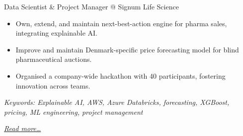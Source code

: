 \large{Data Scientist \& Project Manager @ Signum Life Science}

\normalsize
\begin{itemize}
\item Own, extend, and maintain next-best-action engine for pharma sales, integrating explainable AI.
\item Improve and maintain Denmark-specific price forecasting model for blind pharmaceutical auctions.
\item Organised a company-wide hackathon with 40 participants, fostering innovation across teams.
\end{itemize}

{\footnotesize\textit{Keywords: Explainable AI, AWS, Azure Databricks, forecasting, XGBoost, pricing, ML engineering, project management}}

\hfill{\small{\textit{\hyperref[sec:signum]{Read more…}}}}

